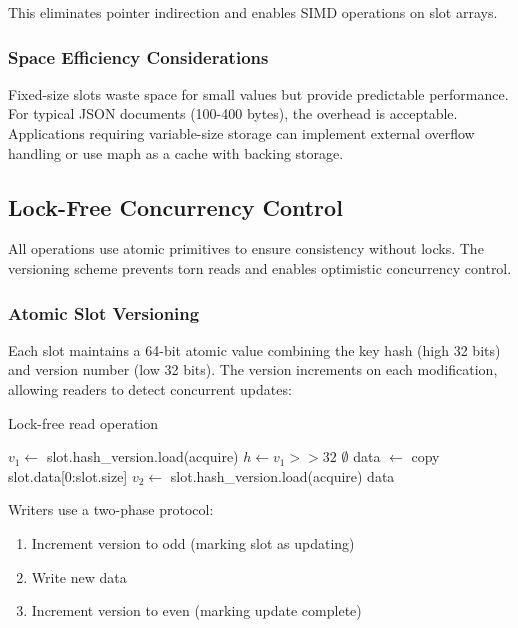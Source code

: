 \documentclass[11pt]{article}
\begin{document}
This eliminates pointer indirection and enables SIMD operations on slot arrays.

\subsubsection{Space Efficiency Considerations}
Fixed-size slots waste space for small values but provide predictable performance. For typical JSON documents (100-400 bytes), the overhead is acceptable. Applications requiring variable-size storage can implement external overflow handling or use maph as a cache with backing storage.

\subsection{Lock-Free Concurrency Control}

All operations use atomic primitives to ensure consistency without locks. The versioning scheme prevents torn reads and enables optimistic concurrency control.

\subsubsection{Atomic Slot Versioning}
Each slot maintains a 64-bit atomic value combining the key hash (high 32 bits) and version number (low 32 bits). The version increments on each modification, allowing readers to detect concurrent updates:

\begin{algorithm}
\caption{Lock-free read operation}
\label{alg:read}
\begin{algorithmic}[1]
\REPEAT
\STATE $v_1 \gets$ slot.hash\_version.load(acquire)
\STATE $h \gets v_1 >> 32$ 
\RETURN $\emptyset$ 
\ENDIF
\STATE data $\gets$ copy slot.data[0:slot.size]
\STATE $v_2 \gets$ slot.hash\_version.load(acquire)
 
\RETURN data
\end{algorithmic}
\end{algorithm}

Writers use a two-phase protocol:
\begin{enumerate}
\item Increment version to odd (marking slot as updating)
\item Write new data
\item Increment version to even (marking update complete)
\end{enumerate}
\end{document}

